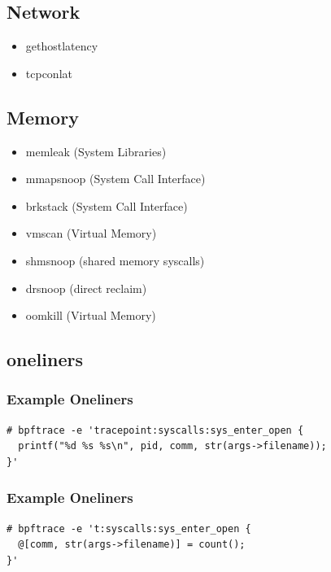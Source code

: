\documentclass{beamer}
\begin{document}
\begin{Large}
\subsection{Network}
\begin{frame}
	\begin{itemize}
		\item<+-> gethostlatency
		\item<+-> tcpconlat 
	\end{itemize}
\end{frame}

\subsection{Memory}
\begin{frame}
	\begin{itemize}
		\item<+-> memleak (System Libraries)
		\item<+-> mmapsnoop (System Call Interface) 
		\item<+-> brkstack (System Call Interface)
		\item<+-> vmscan (Virtual Memory)
		\item<+-> shmsnoop (shared memory syscalls)
		\item<+-> drsnoop (direct reclaim)
		\item<+-> oomkill (Virtual Memory)
	\end{itemize}
\end{frame}

\end{Large}

\subsection{oneliners}
\begin{frame}[fragile] %
\frametitle{Example Oneliners}
\begin{example}
\begin{verbatim}
# bpftrace -e 'tracepoint:syscalls:sys_enter_open {
  printf("%d %s %s\n", pid, comm, str(args->filename));
}'
\end{verbatim}
\end{example}
\end{frame}


\begin{frame}[fragile] %
\frametitle{Example Oneliners}
\begin{example}
\begin{verbatim}
# bpftrace -e 't:syscalls:sys_enter_open { 
  @[comm, str(args->filename)] = count();
}'
\end{verbatim}
\end{example}
\end{frame}
\end{document}
